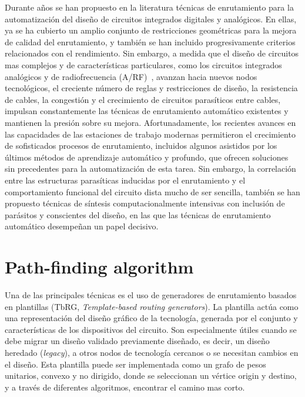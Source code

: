 \documentclass[reprint,amsmath,amssymb,aps]{revtex4-2}
\begin{document}
Durante años se han propuesto en la literatura técnicas de enrutamiento para la automatización del diseño de circuitos integrados digitales y analógicos. En ellas, ya se ha cubierto un amplio conjunto de restricciones geométricas para la mejora de calidad del enrutamiento, y también se han incluido progresivamente criterios relacionados con el rendimiento. Sin embargo, a medida que el diseño de circuitos mas complejos y de características particulares, como los circuitos integrados analógicos y de radiofrecuencia (A/RF)~\cite{unutulmaz, martins}, avanzan hacia nuevos nodos tecnológicos, el creciente número de reglas y restricciones de diseño, la resistencia de cables, la congestión y el crecimiento de circuitos parasíticos entre cables, impulsan constantemente las técnicas de enrutamiento automático existentes y mantienen la presión sobre su mejora. Afortunadamente, los recientes avances en las capacidades de las estaciones de trabajo modernas permitieron el crecimiento de sofisticados procesos de enrutamiento, incluidos algunos asistidos por los últimos métodos de aprendizaje automático y profundo, que ofrecen soluciones sin precedentes para la automatización de esta tarea. Sin embargo, la correlación entre las estructuras parasíticas inducidas por el enrutamiento y el comportamiento funcional del circuito dista mucho de ser sencilla, también se han propuesto técnicas de síntesis computacionalmente intensivas con inclusión de parásitos y conscientes del diseño, en las que las técnicas de enrutamiento automático desempeñan un papel decisivo.\\

\section{Path-finding algorithm}

Una de las principales técnicas es el uso de generadores de enrutamiento basados en plantillas (TbRG, \textit{Template-based routing generators}). La plantilla actúa como una representación del diseño gráfico de la tecnología, generada por el conjunto y características de los dispositivos del circuito. Son especialmente útiles cuando se debe migrar un diseño validado previamente diseñado, es decir, un diseño heredado (\textit{legacy}), a otros nodos de tecnología cercanos o se necesitan cambios en el diseño. Esta plantilla puede ser implementada como un grafo de pesos unitarios, convexo y no dirigido, donde se seleccionan un vértice origin y destino, y a través de diferentes algoritmos, encontrar el camino mas corto.
\end{document}
